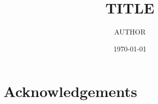 \documentclass[11pt,a4paper]{amsart}   %
\theoremstyle{plain}
\theoremstyle{definition}
\theoremstyle{remark}
\begin{document}
\title{TITLE}
\author{AUTHOR}
\date{\today}

\begin{abstract}

\end{abstract}

\maketitle








\section*{Acknowledgements}




%   
\end{document}
